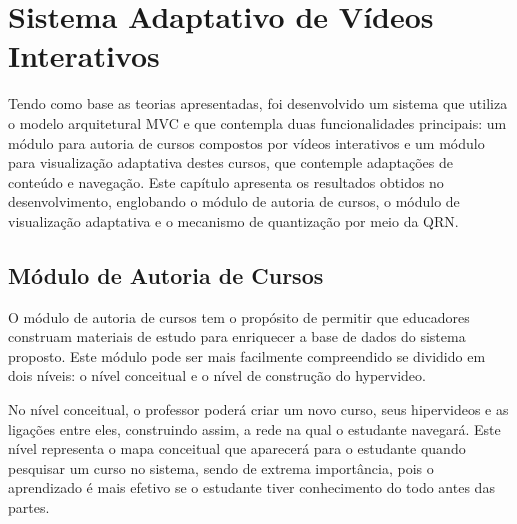 \chapter[Sistema Adaptativo de Vídeos Interativos]{Sistema Adaptativo de Vídeos Interativos}

Tendo como base as teorias apresentadas, foi desenvolvido um sistema que utiliza o modelo arquitetural MVC e que contempla duas funcionalidades principais: um módulo para autoria de cursos compostos por vídeos interativos e um módulo para visualização adaptativa destes cursos, que contemple adaptações de conteúdo e navegação. Este capítulo apresenta os resultados obtidos no desenvolvimento, englobando o módulo de autoria de cursos, o módulo de visualização adaptativa e o mecanismo de quantização por meio da QRN.

\section{Módulo de Autoria de Cursos}

O módulo de autoria de cursos tem o propósito de permitir que educadores construam materiais de estudo para enriquecer a base de dados do sistema proposto. Este módulo pode ser mais facilmente compreendido se dividido em dois níveis: o nível conceitual e o nível de construção do hypervideo.

No nível conceitual, o professor poderá criar um novo curso, seus hipervideos e as ligações entre eles, construindo assim, a rede na qual o estudante navegará. Este nível representa o mapa conceitual que aparecerá para o estudante quando pesquisar um curso no sistema, sendo de extrema importância, pois o aprendizado é mais efetivo se o estudante tiver conhecimento do todo antes das partes.


